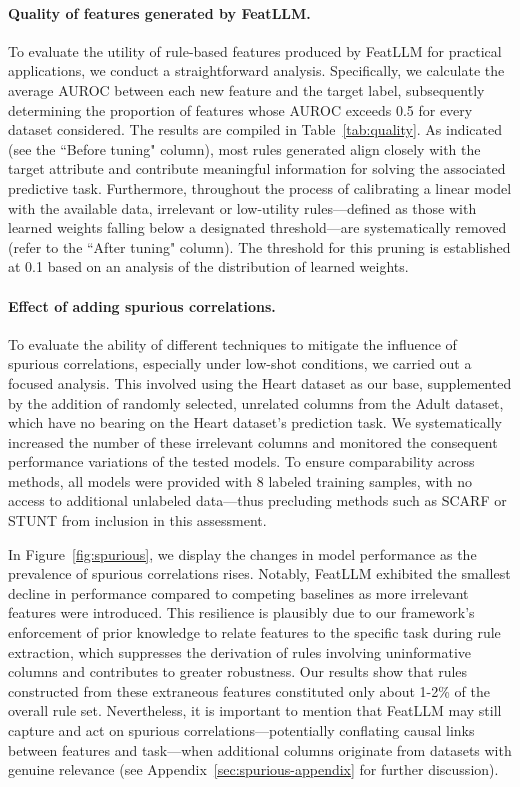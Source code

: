 \paragraph{Quality of features generated by \textsf{FeatLLM}.}
To evaluate the utility of rule-based features produced by \textsf{FeatLLM} for practical applications, we conduct a straightforward analysis. Specifically, we calculate the average AUROC between each new feature and the target label, subsequently determining the proportion of features whose AUROC exceeds 0.5 for every dataset considered. The results are compiled in Table~\ref{tab:quality}. As indicated (see the ``Before tuning" column), most rules generated align closely with the target attribute and contribute meaningful information for solving the associated predictive task. Furthermore, throughout the process of calibrating a linear model with the available data, irrelevant or low-utility rules—defined as those with learned weights falling below a designated threshold—are systematically removed (refer to the ``After tuning" column). The threshold for this pruning is established at 0.1 based on an analysis of the distribution of learned weights.

\vspace*{-0.12in}
\paragraph{Effect of adding spurious correlations.} To evaluate the ability of different techniques to mitigate the influence of spurious correlations, especially under low-shot conditions, we carried out a focused analysis. This involved using the Heart dataset as our base, supplemented by the addition of randomly selected, unrelated columns from the Adult dataset, which have no bearing on the Heart dataset's prediction task. We systematically increased the number of these irrelevant columns and monitored the consequent performance variations of the tested models. To ensure comparability across methods, all models were provided with 8 labeled training samples, with no access to additional unlabeled data—thus precluding methods such as SCARF or STUNT from inclusion in this assessment.

In Figure~\ref{fig:spurious}, we display the changes in model performance as the prevalence of spurious correlations rises. Notably, \textsf{FeatLLM} exhibited the smallest decline in performance compared to competing baselines as more irrelevant features were introduced. This resilience is plausibly due to our framework's enforcement of prior knowledge to relate features to the specific task during rule extraction, which suppresses the derivation of rules involving uninformative columns and contributes to greater robustness. Our results show that rules constructed from these extraneous features constituted only about 1-2\% of the overall rule set. Nevertheless, it is important to mention that \textsf{FeatLLM} may still capture and act on spurious correlations—potentially conflating causal links between features and task—when additional columns originate from datasets with genuine relevance (see Appendix~\ref{sec:spurious-appendix} for further discussion).

